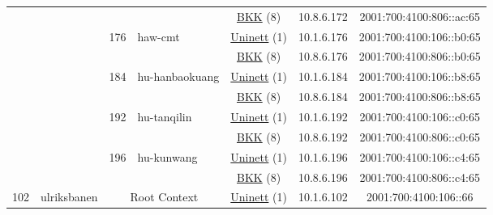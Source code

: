 \begin{small}
\begin{center}
\begin{longtable}{|c|c|c|c|c|c|c|c|}
  &  &  &  & \multicolumn{2}{|c|}{\tiny{\href{http://bkk.no}{BKK} (8)}} & \tiny{10.8.6.172} & \tiny{2001:700:4100:806::ac:65} \\* \cline{3-3}\cline{4-4}\cline{5-5}\cline{6-6}\cline{7-7}\cline{8-8}
  &  & \multirow{2}{*}{\tiny{176}} & \multicolumn{1}{|l|}{\multirow{2}{*}{\tiny{haw-cmt}}} & \multicolumn{2}{|c|}{\tiny{\href{https://www.uninett.no}{Uninett} (1)}} & \tiny{10.1.6.176} & \tiny{2001:700:4100:106::b0:65} \\* \cline{5-5}\cline{6-6}\cline{7-7}\cline{8-8}
  &  &  &  & \multicolumn{2}{|c|}{\tiny{\href{http://bkk.no}{BKK} (8)}} & \tiny{10.8.6.176} & \tiny{2001:700:4100:806::b0:65} \\* \cline{3-3}\cline{4-4}\cline{5-5}\cline{6-6}\cline{7-7}\cline{8-8}
  &  & \multirow{2}{*}{\tiny{184}} & \multicolumn{1}{|l|}{\multirow{2}{*}{\tiny{hu-hanbaokuang}}} & \multicolumn{2}{|c|}{\tiny{\href{https://www.uninett.no}{Uninett} (1)}} & \tiny{10.1.6.184} & \tiny{2001:700:4100:106::b8:65} \\* \cline{5-5}\cline{6-6}\cline{7-7}\cline{8-8}
  &  &  &  & \multicolumn{2}{|c|}{\tiny{\href{http://bkk.no}{BKK} (8)}} & \tiny{10.8.6.184} & \tiny{2001:700:4100:806::b8:65} \\* \cline{3-3}\cline{4-4}\cline{5-5}\cline{6-6}\cline{7-7}\cline{8-8}
  &  & \multirow{2}{*}{\tiny{192}} & \multicolumn{1}{|l|}{\multirow{2}{*}{\tiny{hu-tanqilin}}} & \multicolumn{2}{|c|}{\tiny{\href{https://www.uninett.no}{Uninett} (1)}} & \tiny{10.1.6.192} & \tiny{2001:700:4100:106::c0:65} \\* \cline{5-5}\cline{6-6}\cline{7-7}\cline{8-8}
  &  &  &  & \multicolumn{2}{|c|}{\tiny{\href{http://bkk.no}{BKK} (8)}} & \tiny{10.8.6.192} & \tiny{2001:700:4100:806::c0:65} \\* \cline{3-3}\cline{4-4}\cline{5-5}\cline{6-6}\cline{7-7}\cline{8-8}
  &  & \multirow{2}{*}{\tiny{196}} & \multicolumn{1}{|l|}{\multirow{2}{*}{\tiny{hu-kunwang}}} & \multicolumn{2}{|c|}{\tiny{\href{https://www.uninett.no}{Uninett} (1)}} & \tiny{10.1.6.196} & \tiny{2001:700:4100:106::c4:65} \\* \cline{5-5}\cline{6-6}\cline{7-7}\cline{8-8}
  &  &  &  & \multicolumn{2}{|c|}{\tiny{\href{http://bkk.no}{BKK} (8)}} & \tiny{10.8.6.196} & \tiny{2001:700:4100:806::c4:65} \\ \hline
 \multirow{24}{*}{\tiny{102}} & \multicolumn{1}{|l|}{\multirow{24}{*}{\tiny{ulriksbanen}}} & \multicolumn{2}{|c|}{\multirow{2}{*}{\tiny{Root Context}}} & \multicolumn{2}{|c|}{\tiny{\href{https://www.uninett.no}{Uninett} (1)}} & \tiny{10.1.6.102} & \tiny{2001:700:4100:106::66} \\* \cline{5-5}\cline{6-6}\cline{7-7}\cline{8-8}

\end{longtable}
\end{center}
\end{small}
